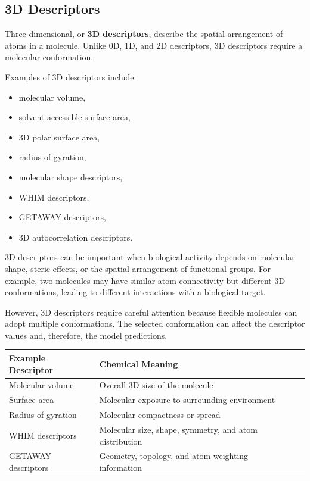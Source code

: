 \documentclass[11pt]{report}
\newenvironment{Important note}{\begin{quote}\color{red}\textbf{Important note:} }{\end{quote}}
\begin{document}
\subsection{3D Descriptors}

Three-dimensional, or \textbf{3D descriptors}, describe the spatial arrangement of atoms in a molecule. Unlike 0D, 1D, and 2D descriptors, 3D descriptors require a molecular conformation.

Examples of 3D descriptors include:

\begin{itemize}[leftmargin=*]
    \item molecular volume,
    \item solvent-accessible surface area,
    \item 3D polar surface area,
    \item radius of gyration,
    \item molecular shape descriptors,
    \item WHIM descriptors,
    \item GETAWAY descriptors,
    \item 3D autocorrelation descriptors.
\end{itemize}

3D descriptors can be important when biological activity depends on molecular shape, steric effects, or the spatial arrangement of functional groups. For example, two molecules may have similar atom connectivity but different 3D conformations, leading to different interactions with a biological target.

However, 3D descriptors require careful attention because flexible molecules can adopt multiple conformations. The selected conformation can affect the descriptor values and, therefore, the model predictions.

\begin{center}
\begin{tabular}{lll}
\toprule
\textbf{Example Descriptor} & \textbf{Chemical Meaning} \\
\midrule
Molecular volume & Overall 3D size of the molecule \\
Surface area & Molecular exposure to surrounding environment \\
Radius of gyration & Molecular compactness or spread \\
WHIM descriptors & Molecular size, shape, symmetry, and atom distribution \\
GETAWAY descriptors & Geometry, topology, and atom weighting information \\
\bottomrule
\end{tabular}
\end{center}
\end{document}
